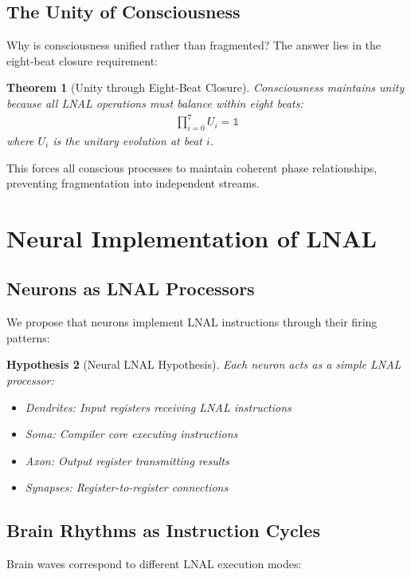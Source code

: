 \documentclass[12pt,a4paper]{article}
\newtheorem{theorem}{Theorem}[section]
\newtheorem{hypothesis}[theorem]{Hypothesis}
\begin{document}
\subsection{The Unity of Consciousness}

Why is consciousness unified rather than fragmented? The answer lies in the eight-beat closure requirement:

\begin{theorem}[Unity through Eight-Beat Closure]
Consciousness maintains unity because all LNAL operations must balance within eight beats:
\begin{align}
\prod_{i=0}^{7} U_i = \mathbb{1}
\end{align}
where $U_i$ is the unitary evolution at beat $i$.
\end{theorem}

This forces all conscious processes to maintain coherent phase relationships, preventing fragmentation into independent streams.

\section{Neural Implementation of LNAL}

\subsection{Neurons as LNAL Processors}

We propose that neurons implement LNAL instructions through their firing patterns:

\begin{hypothesis}[Neural LNAL Hypothesis]
Each neuron acts as a simple LNAL processor:
\begin{itemize}
\item Dendrites: Input registers receiving LNAL instructions
\item Soma: Compiler core executing instructions
\item Axon: Output register transmitting results
\item Synapses: Register-to-register connections
\end{itemize}
\end{hypothesis}

\subsection{Brain Rhythms as Instruction Cycles}

Brain waves correspond to different LNAL execution modes:
\end{document}

